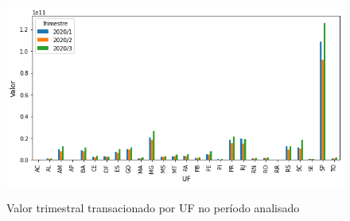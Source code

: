 \begin{figure}[htb]
	\centering
    \caption{Valor trimestral transacionado por UF no período analisado}
    \includegraphics[scale=0.7]{images/base-de-dados-21.2-valor-trimestral-por-uf.png}
    \label{fig:pandemia:base-de-dados-21.2-valor-trimestral-por-uf}
    \fdadospesquisa
\end{figure}

